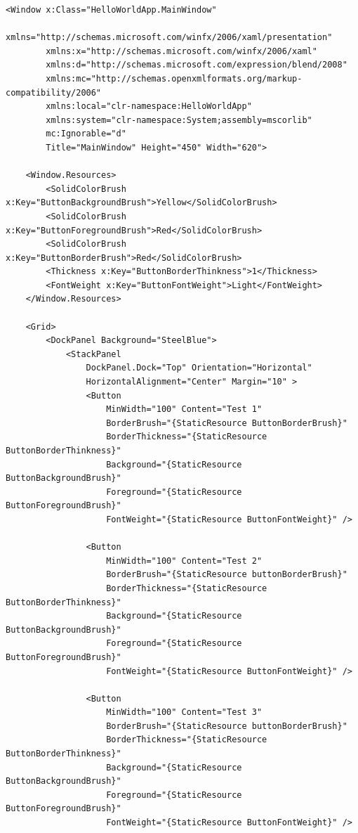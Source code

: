 \begin{verbatim}
<Window x:Class="HelloWorldApp.MainWindow"
        xmlns="http://schemas.microsoft.com/winfx/2006/xaml/presentation"
        xmlns:x="http://schemas.microsoft.com/winfx/2006/xaml"
        xmlns:d="http://schemas.microsoft.com/expression/blend/2008"
        xmlns:mc="http://schemas.openxmlformats.org/markup-compatibility/2006"
        xmlns:local="clr-namespace:HelloWorldApp"
        xmlns:system="clr-namespace:System;assembly=mscorlib"
        mc:Ignorable="d"
        Title="MainWindow" Height="450" Width="620">

    <Window.Resources>
        <SolidColorBrush x:Key="ButtonBackgroundBrush">Yellow</SolidColorBrush>
        <SolidColorBrush x:Key="ButtonForegroundBrush">Red</SolidColorBrush>
        <SolidColorBrush x:Key="ButtonBorderBrush">Red</SolidColorBrush>
        <Thickness x:Key="ButtonBorderThinkness">1</Thickness>
        <FontWeight x:Key="ButtonFontWeight">Light</FontWeight>
    </Window.Resources>
    
    <Grid>
        <DockPanel Background="SteelBlue">
            <StackPanel 
                DockPanel.Dock="Top" Orientation="Horizontal" 
                HorizontalAlignment="Center" Margin="10" >
                <Button
                    MinWidth="100" Content="Test 1" 
                    BorderBrush="{StaticResource ButtonBorderBrush}"
                    BorderThickness="{StaticResource ButtonBorderThinkness}"
                    Background="{StaticResource ButtonBackgroundBrush}"
                    Foreground="{StaticResource ButtonForegroundBrush}"
                    FontWeight="{StaticResource ButtonFontWeight}" />

                <Button
                    MinWidth="100" Content="Test 2" 
                    BorderBrush="{StaticResource buttonBorderBrush}"
                    BorderThickness="{StaticResource ButtonBorderThinkness}"
                    Background="{StaticResource ButtonBackgroundBrush}"
                    Foreground="{StaticResource ButtonForegroundBrush}"
                    FontWeight="{StaticResource ButtonFontWeight}" />

                <Button
                    MinWidth="100" Content="Test 3" 
                    BorderBrush="{StaticResource buttonBorderBrush}"
                    BorderThickness="{StaticResource ButtonBorderThinkness}"
                    Background="{StaticResource ButtonBackgroundBrush}"
                    Foreground="{StaticResource ButtonForegroundBrush}"
                    FontWeight="{StaticResource ButtonFontWeight}" />


\end{verbatim}
